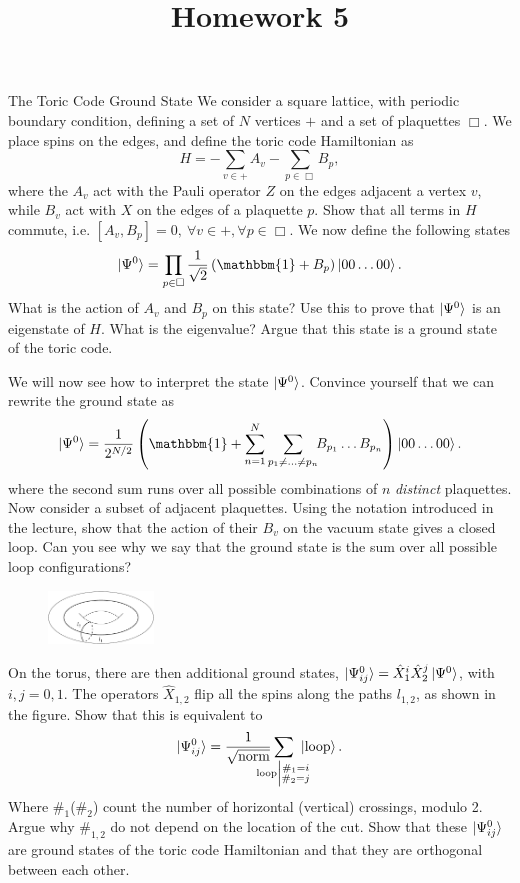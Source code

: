 \documentclass[a4paper,10pt,twoside]{article}
\def \id {{\mathbbm{1}}}
\theoremstyle{modern}
\begin{document}
\title{\vspace{-1cm}\sffamily Homework 5\vspace{-1cm}}
\author{}
\date{}
\maketitle
\thispagestyle{fancy}

\begin{section}{The Toric Code Ground State}
We consider a square lattice, with periodic boundary condition, defining a set of $N$ vertices $+$ and a set of plaquettes $\Box$.
We place spins on the edges, and define the toric code Hamiltonian as
\[
  H = -\sum_{v \in +} A_v - \sum_{p \in \Box} B_p ,
\]
where the $A_v$ act with the Pauli operator $Z$ on the edges adjacent a vertex $v$, while $B_v$ act with $X$ on the edges of a plaquette $p$.
Show that all terms in $H$ commute, i.e. $[A_v,B_p] = 0,\ \forall v \in + , \forall p \in \Box$.
We now define the following states
\[
  \ket{\Psi^0} = \prod_{p \in \Box} \frac{1}{\sqrt{2}} \left(\id + B_p\right) \ket{0 0 \dots 0 0}.
\]
What is the action of $A_v$ and $B_p$ on this state? 
Use this to prove  that $\ket{\Psi^0}$ is an eigenstate of $H$.
What is the eigenvalue?
Argue that this state is a ground state of the toric code.

We will now see how to interpret the state $\ket{\Psi^0}$.
Convince yourself that we can rewrite the ground state as
\[
   \ket{\Psi^0} = \frac{1}{2^{N/2}}\left( \id + \sum_{n=1}^N \sum_{p_1 \neq \dots \neq p_n} \!\! B_{p_1}\dots B_{p_n}\right) \ket{0 0 \dots 0 0} .
\]
where the second sum runs over all possible combinations of $n$ \emph{distinct} plaquettes.
Now consider a subset of adjacent plaquettes. 
Using the notation introduced in the lecture, show that the action of their $B_v$ on the vacuum state gives a closed loop.
Can you see why we say that the ground state is the sum over all possible loop configurations?

\begin{figure}
\includegraphics[width=0.25\textwidth]{img/torus-loops}
\end{figure}

On the torus, there are then additional ground states, $ \ket{\Psi_{ij}^0} = \hat{X}_1^i \hat{X}_2^j \ket{\Psi^0}$, with $ i,j = 0,1$.
The operators $\hat{X}_{1,2}$ flip all the spins along the paths $l_{1,2}$, as shown in the figure.
Show that this is equivalent to
\[
  \ket{\Psi_{ij}^0} = \frac{1}{\sqrt{\rm norm}}\sum_{\mathclap{{\rm loop} \left| \substack{\#_1 = i \\ \#_2 = j } \right. }}  \ \ket{\rm loop} .
\]
Where $\#_1$($ \#_2$) count the number of horizontal (vertical) crossings, modulo 2.
Argue why $\#_{1,2}$ do not depend on the location of the cut.
Show that these $\ket{\Psi^0_{ij}}$ are  ground states of the toric code Hamiltonian and that they are orthogonal between each other.
\end{section}
\end{document}
